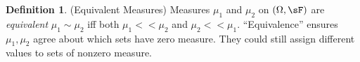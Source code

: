 \documentclass[12pt]{article}
\theoremstyle{plain}
\newtheorem{lem}[thm]{Lemma}
\theoremstyle{definition}
\newtheorem{defn}[thm]{Definition}
\theoremstyle{remark}
\newcommand{\one}[1]{\mathbf{1}_{#1}}
\newcommand{\sumninf}{\sum^\infty_{n=1}}
\begin{document}
\begin{defn}(Equivalent Measures)
Measures $\mu_1$ and $\mu_2$ on $(\Omega,\sF)$
are \emph{equivalent} $\mu_1\sim\mu_2$
iff both $\mu_1<<\mu_2$ and $\mu_2<<\mu_1$.
``Equivalence'' ensures $\mu_1,\mu_2$ agree about
which sets have zero measure. They could still assign
different values to sets of nonzero measure.
\end{defn}


\end{document}
